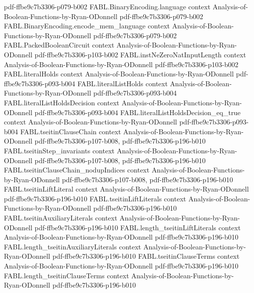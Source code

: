 \begin{theorem}
  {pdf-ffbe9c7b3306-p079-b002}
\proofstep
  {FABL.BinaryEncoding.language}
  {context}
  {Analysis-of-Boolean-Functions-by-Ryan-ODonnell}
  {pdf-ffbe9c7b3306-p079-b002}
\proofstep
  {FABL.BinaryEncoding.encode_mem_language}
  {context}
  {Analysis-of-Boolean-Functions-by-Ryan-ODonnell}
  {pdf-ffbe9c7b3306-p079-b002}
\proofstep
  {FABL.PackedBooleanCircuit}
  {context}
  {Analysis-of-Boolean-Functions-by-Ryan-ODonnell}
  {pdf-ffbe9c7b3306-p103-b002}
\proofstep
  {FABL.instNeZeroNatInputLength}
  {context}
  {Analysis-of-Boolean-Functions-by-Ryan-ODonnell}
  {pdf-ffbe9c7b3306-p103-b002}
\proofstep
  {FABL.literalHolds}
  {context}
  {Analysis-of-Boolean-Functions-by-Ryan-ODonnell}
  {pdf-ffbe9c7b3306-p093-b004}
\proofstep
  {FABL.literalListHolds}
  {context}
  {Analysis-of-Boolean-Functions-by-Ryan-ODonnell}
  {pdf-ffbe9c7b3306-p093-b004}
\proofstep
  {FABL.literalListHoldsDecision}
  {context}
  {Analysis-of-Boolean-Functions-by-Ryan-ODonnell}
  {pdf-ffbe9c7b3306-p093-b004}
\proofstep
  {FABL.literalListHoldsDecision_eq_true}
  {context}
  {Analysis-of-Boolean-Functions-by-Ryan-ODonnell}
  {pdf-ffbe9c7b3306-p093-b004}
\proofstep
  {FABL.tseitinClauseChain}
  {context}
  {Analysis-of-Boolean-Functions-by-Ryan-ODonnell}
  {pdf-ffbe9c7b3306-p107-b008,
    pdf-ffbe9c7b3306-p196-b010}
\proofstep
  {FABL.tseitinStep_invariants}
  {context}
  {Analysis-of-Boolean-Functions-by-Ryan-ODonnell}
  {pdf-ffbe9c7b3306-p107-b008,
    pdf-ffbe9c7b3306-p196-b010}
\proofstep
  {FABL.tseitinClauseChain_nodupIndices}
  {context}
  {Analysis-of-Boolean-Functions-by-Ryan-ODonnell}
  {pdf-ffbe9c7b3306-p107-b008,
    pdf-ffbe9c7b3306-p196-b010}
\proofstep
  {FABL.tseitinLiftLiteral}
  {context}
  {Analysis-of-Boolean-Functions-by-Ryan-ODonnell}
  {pdf-ffbe9c7b3306-p196-b010}
\proofstep
  {FABL.tseitinLiftLiterals}
  {context}
  {Analysis-of-Boolean-Functions-by-Ryan-ODonnell}
  {pdf-ffbe9c7b3306-p196-b010}
\proofstep
  {FABL.tseitinAuxiliaryLiterals}
  {context}
  {Analysis-of-Boolean-Functions-by-Ryan-ODonnell}
  {pdf-ffbe9c7b3306-p196-b010}
\proofstep
  {FABL.length_tseitinLiftLiterals}
  {context}
  {Analysis-of-Boolean-Functions-by-Ryan-ODonnell}
  {pdf-ffbe9c7b3306-p196-b010}
\proofstep
  {FABL.length_tseitinAuxiliaryLiterals}
  {context}
  {Analysis-of-Boolean-Functions-by-Ryan-ODonnell}
  {pdf-ffbe9c7b3306-p196-b010}
\proofstep
  {FABL.tseitinClauseTerms}
  {context}
  {Analysis-of-Boolean-Functions-by-Ryan-ODonnell}
  {pdf-ffbe9c7b3306-p196-b010}
\proofstep
  {FABL.length_tseitinClauseTerms}
  {context}
  {Analysis-of-Boolean-Functions-by-Ryan-ODonnell}
  {pdf-ffbe9c7b3306-p196-b010}

\end{theorem}
